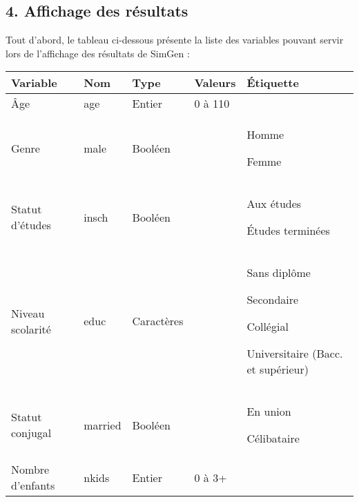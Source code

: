 \documentclass[letterpaper,10pt,french]{sphinxmanual}
\begin{document}
\begin{DUlineblock}{0em}
\item[] 
\end{DUlineblock}


\subsection{4. Affichage des résultats}
\label{\detokenize{utilisation:affichage-des-resultats}}
Tout d’abord, le tableau ci-dessous présente la liste des variables pouvant servir lors de l’affichage des résultats de SimGen :


\begin{savenotes}\sphinxattablestart
\centering
\begin{tabulary}{\linewidth}[t]{|T|T|T|T|T|}
\hline
\sphinxstyletheadfamily 
Variable
&\sphinxstyletheadfamily 
Nom
&\sphinxstyletheadfamily 
Type
&\sphinxstyletheadfamily 
Valeurs
&\sphinxstyletheadfamily 
Étiquette
\\
\hline
Âge
&
age
&
Entier
&
0 à 110
&\\
\hline
Genre
&
male
&
Booléen
&

&
Homme

Femme
\\
\hline
Statut d’études
&
insch
&
Booléen
&

&
Aux études

Études terminées
\\
\hline
Niveau scolarité
&
educ
&
Caractères
&



&
Sans diplôme

Secondaire

Collégial

Universitaire (Bacc. et supérieur)
\\
\hline
Statut conjugal
&
married
&
Booléen
&

&
En union

Célibataire
\\
\hline
Nombre d’enfants
&
nkids
&
Entier
&
0 à 3+
&\\
\hline
\end{tabulary}
\par
\sphinxattableend\end{savenotes}
\end{document}
